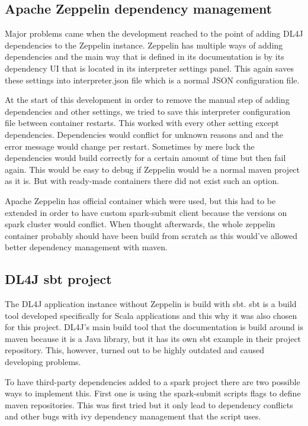 \subsection{Apache Zeppelin dependency management}

Major problems came when the development reached to the point of adding DL4J dependencies to the Zeppelin instance.
Zeppelin has multiple ways of adding dependencies and the main way that is defined in its documentation is by its dependency UI that is located in its interpreter settings panel.
This again saves these settings into interpreter.json file which is a normal JSON configuration file.

At the start of this development in order to remove the manual step of adding dependencies and other settings, we tried to save this interpreter configuration file between container restarts.
This worked with every other setting except dependencies.
Dependencies would conflict for unknown reasons and and the error message would change per restart.
Sometimes by mere luck the dependencies would build correctly for a certain amount of time but then fail again.
This would be easy to debug if Zeppelin would be a normal maven project as it is.
But with ready-made containers there did not exist such an option.

Apache Zeppelin has official container which were used, but this had to be extended in order to have custom spark-submit client because the versions on spark cluster would conflict.
When thought afterwards, the whole zeppelin container probably should have been build from scratch as this would've allowed better dependency management with maven.

\subsection{DL4J sbt project}

The DL4J application instance without Zeppelin is build with sbt.
sbt is a build tool developed specifically for Scala applications and this why it was also chosen for this project.
DL4J's main build tool that the documentation is build around is maven because it is a Java library, but it has its own sbt example in their project repository.
This, however, turned out to be highly outdated and caused developing problems.

To have third-party dependencies added to a spark project there are two possible ways to implement this.
First one is using the spark-submit scripts flags to define maven repositories.
This was first tried but it only lead to dependency conflicts and other bugs with ivy dependency management that the script uses.

